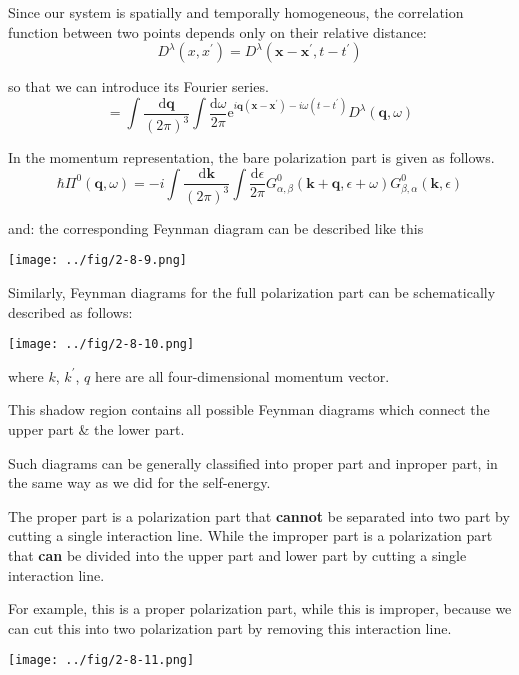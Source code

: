 Since our system is spatially and temporally homogeneous, the correlation function between two points depends only on their relative distance:
\[D^{\lambda}(x,x^{'}) = D^{\lambda}(\mathbf{x}-\mathbf{x}^{'},t-t^{'})\]

so that we can introduce its Fourier series.
\[=\int \frac{\mathrm{d}\mathbf{q}}{(2\pi)^3}\int \frac{\mathrm{d} \omega}{2\pi} \mathrm{e}^{i \mathbf{q}(\mathbf{x}-\mathbf{x}^{'})-i \omega(t-t^{'})}D^{\lambda}(\mathbf{q},\omega)\]

In the momentum representation, the bare polarization part is given as follows.
\[ \hbar \Pi^0(\mathbf{q},\omega) = -i \int \frac{\mathrm{d}\mathbf{k}}{(2\pi)^3} \int \frac{\mathrm{d}\epsilon}{2\pi} G^0_{\alpha,\beta}(\mathbf{k}+\mathbf{q},\epsilon+\omega)G^0_{\beta,\alpha}(\mathbf{k},\epsilon) \]

and: the corresponding Feynman diagram can be described like this
\begin{center} \label{Fig2.8.9}
\texttt{[image: ../fig/2-8-9.png]}
\end{center}

Similarly, Feynman diagrams for the full polarization part can be schematically described as follows:
\begin{center} \label{Fig2.8.10}
\texttt{[image: ../fig/2-8-10.png]}
\end{center}

where $k$, $k^{'}$, $q$ here are all four-dimensional momentum vector.

This shadow region contains all possible Feynman diagrams which connect the upper part \& the lower part.

Such diagrams can be generally classified into proper part and inproper part, in the same way as we did for the self-energy.

The proper part is a polarization part that \textbf{cannot} be separated into two part by cutting a single interaction line. While the improper part is a polarization part that \textbf{can} be divided into the upper part and lower part by cutting a single interaction line.

For example, this is a proper polarization part, while this is improper, because we can cut this into two polarization part by removing this interaction line.
\begin{center} \label{Fig2.8.11}
\texttt{[image: ../fig/2-8-11.png]}
\end{center}

